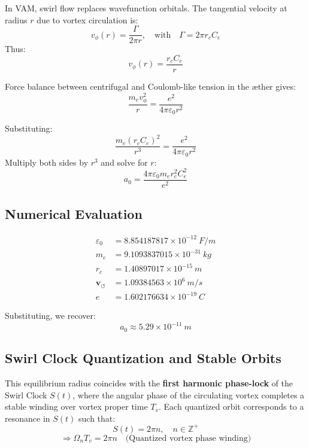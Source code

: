 In VAM, swirl flow replaces wavefunction orbitals. The tangential velocity at radius $r$ due to vortex circulation is:
\begin{equation}
    v_\phi(r) = \frac{\Gamma}{2\pi r}, \quad \text{with} \quad \Gamma = 2\pi r_c C_e
\end{equation}
Thus:
\begin{equation}
    v_\phi(r) = \frac{r_c C_e}{r}
\end{equation}

Force balance between centrifugal and Coulomb-like tension in the \ae ther gives:
\begin{equation}
    \frac{m_e v_\phi^2}{r} = \frac{e^2}{4\pi \varepsilon_0 r^2}
\end{equation}

Substituting:
\begin{equation}
    \frac{m_e (r_c C_e)^2}{r^3} = \frac{e^2}{4\pi \varepsilon_0 r^2}
\end{equation}
Multiply both sides by $r^3$ and solve for $r$:
\begin{equation}
    a_0 = \frac{4\pi \varepsilon_0 m_e r_c^2 C_e^2}{e^2}
\end{equation}

\subsection*{Numerical Evaluation}

\begin{align*}
    \varepsilon_0 &= 8.854187817 \times 10^{-12}~\si{F/m} \\
    m_e &= 9.1093837015 \times 10^{-31}~\si{kg} \\
    r_c &= 1.40897017 \times 10^{-15}~\si{m} \\
    \mathbf{v}_{\scriptscriptstyle\boldsymbol{\circlearrowleft}} &= 1.09384563 \times 10^6~\si{m/s} \\
    e &= 1.602176634 \times 10^{-19}~\si{C}
\end{align*}

Substituting, we recover:
\[
    a_0 \approx 5.29 \times 10^{-11}~\si{m}
\]

\subsection*{Swirl Clock Quantization and Stable Orbits}

This equilibrium radius coincides with the \textbf{first harmonic phase-lock} of the Swirl Clock $S(t)$, where the angular phase of the circulating vortex completes a stable winding over vortex proper time $T_v$. Each quantized orbit corresponds to a resonance in $S(t)$ such that:
\[
    S(t) = 2\pi n, \quad n \in \mathbb{Z}^+
\]
\[
    \Rightarrow \Omega_n T_v = 2\pi n \quad \text{(Quantized vortex phase winding)}
\]

